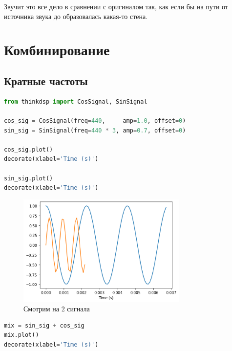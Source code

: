 \documentclass[a4paper,12pt]{report}
\begin{document}
    Звучит это все дело в сравнении с оригиналом так, как если бы на пути от источника звука до  образовалась какая-то стена.
    
    \chapter{Комбинирование}
    \section{Кратные частоты}
    
\begin{lstlisting}[language=Python,caption=Создаем 2 сигнала]
from thinkdsp import CosSignal, SinSignal

cos_sig = CosSignal(freq=440,     amp=1.0, offset=0)
sin_sig = SinSignal(freq=440 * 3, amp=0.7, offset=0)

cos_sig.plot()
decorate(xlabel='Time (s)')

sin_sig.plot()
decorate(xlabel='Time (s)')
\end{lstlisting}

    \begin{figure}[H]
        \centering
        \includegraphics[width=0.75\textwidth]{ex3_creating_2_signals.png}
        \caption{Смотрим на 2 сигнала}
        \label{fig:ex3_creating_2_signals}
    \end{figure}
    
\begin{lstlisting}[language=Python,caption=Суммируем 2 сигнала]
mix = sin_sig + cos_sig
mix.plot()
decorate(xlabel='Time (s)')
\end{lstlisting}
\end{document}
